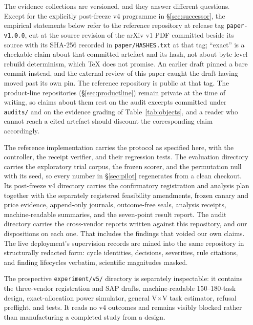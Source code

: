 \documentclass[11pt,letterpaper]{article}
\begin{document}
The evidence collections are versioned, and they answer different questions. Except for the explicitly post-freeze v4 programme in \S\ref{sec:successor}, the empirical statements below refer to the reference repository at release tag \texttt{paper-v1.0.0}, cut at the source revision of the arXiv v1 PDF committed beside its source with its SHA-256 recorded in \texttt{paper/HASHES.txt} at that tag; ``exact'' is a checkable claim about that committed artefact and its hash, not about byte-level rebuild determinism, which TeX does not promise. An earlier draft pinned a bare commit instead, and the external review of this paper caught the draft having moved past its own pin. The reference repository is public at that tag. The product-line repositories (\S\ref{sec:productline}) remain private at the time of writing, so claims about them rest on the audit excerpts committed under \texttt{audits/} and on the evidence grading of Table~\ref{tab:objects}, and a reader who cannot reach a cited artefact should discount the corresponding claim accordingly.

The reference implementation carries the protocol as specified here, with the controller, the receipt verifier, and their regression tests. The evaluation directory carries the exploratory trial corpus, the frozen scorer, and the permutation null with its seed, so every number in \S\ref{sec:pilot} regenerates from a clean checkout. Its post-freeze v4 directory carries the confirmatory registration and analysis plan together with the separately registered feasibility amendments, frozen canary and price evidence, append-only journals, outcome-free seals, analysis receipts, machine-readable summaries, and the seven-point result report. The audit directory carries the cross-vendor reports written against this repository, and our dispositions on each one. That includes the findings that voided our own claims. The live deployment's supervision records are mined into the same repository in structurally redacted form: cycle identities, decisions, severities, rule citations, and finding lifecycles verbatim, scientific magnitudes masked.

The prospective \texttt{experiment/v5/} directory is separately inspectable: it contains the three-vendor registration and SAP drafts, machine-readable 150--180-task design, exact-allocation power simulator, general V$\times$V task estimator, refusal preflight, and tests. It reads no v4 outcomes and remains visibly blocked rather than manufacturing a completed study from a design.
\end{document}
